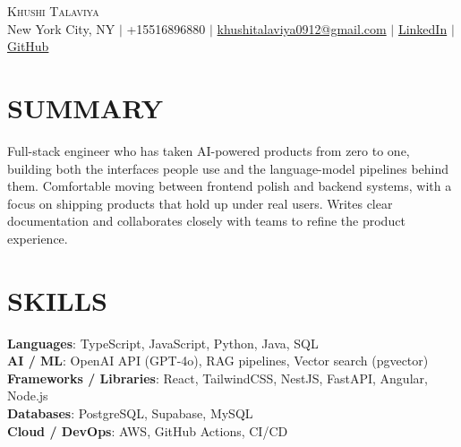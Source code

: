 \documentclass[letterpaper,11pt]{article}
\begin{document}
\begin{center}
    {\Huge \scshape Khushi Talaviya} \\ \vspace{2pt}
    \vspace{4pt}
    \small
    New York City, NY $|$
    \small
    +15516896880 $|$
    \href{mailto:khushitalaviya0912@gmail.com}{khushitalaviya0912@gmail.com} $|$
    \href{https://www.linkedin.com/in/khushitalaviya/}{LinkedIn} $|$
    \href{https://github.com/talaviyakhushi}{GitHub}
\end{center}

\section{SUMMARY}
\vspace{5pt}
\small{Full-stack engineer who has taken AI-powered products from zero to one, building both the interfaces people use and the language-model pipelines behind them. Comfortable moving between frontend polish and backend systems, with a focus on shipping products that hold up under real users. Writes clear documentation and collaborates closely with teams to refine the product experience.}

\vspace{2pt}
\section{SKILLS}
\vspace{5pt}
\begin{itemize}[leftmargin=0in, label={}]
\small{\item{
\textbf{Languages}{: TypeScript, JavaScript, Python, Java, SQL} \\
\textbf{AI / ML}{: OpenAI API (GPT-4o), RAG pipelines, Vector search (pgvector)} \\
\textbf{Frameworks / Libraries}{: React, TailwindCSS, NestJS, FastAPI, Angular, Node.js} \\
\textbf{Databases}{: PostgreSQL, Supabase, MySQL} \\
\textbf{Cloud / DevOps}{: AWS, GitHub Actions, CI/CD}
}}
\end{itemize}
\vspace{-10pt}

\end{document}
